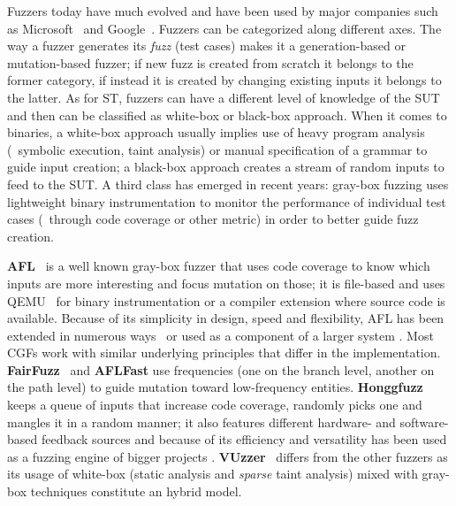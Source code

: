 Fuzzers today have much evolved and have been used by major companies such as
Microsoft~\cite{godefroid2008grammar} and
Google~\cite{google2016fuzz,google2011fuzz,google2016oss,google2017oss}. Fuzzers
can be categorized along different axes. The way a fuzzer generates its
\emph{fuzz} (test cases) makes it a generation-based or mutation-based fuzzer;
if new fuzz is created from scratch it belongs to the former category, if
instead it is created by changing existing inputs it belongs to the latter. As
for \ac{ST}, fuzzers can have a different level of knowledge of the \ac{SUT} and
then can be classified as white-box or black-box approach. When it comes to
binaries, a white-box approach usually implies use of heavy program analysis
(\eg~symbolic execution, taint analysis) or manual specification of a grammar to
guide input creation; a black-box approach creates a stream of random inputs to
feed to the \ac{SUT}. A third class has emerged in recent years: gray-box
fuzzing uses lightweight binary instrumentation to monitor the performance of
individual test cases (\eg~through code coverage or other metric) in order to
better guide fuzz creation.

\textbf{AFL}~\cite{afl} is a well known gray-box fuzzer that uses code coverage
to know which inputs are more interesting and focus mutation on those; it is
file-based and uses QEMU~\cite{bellard2005qemu} for binary instrumentation or a
compiler extension where source code is available. Because of its simplicity in
design, speed and flexibility, AFL has been extended in numerous
ways~\cite{bohme2017coverage,bohme2017directed,lemieux2017fairfuzz} or used as a
component of a larger system
\cite{stephens2016driller,nichols2017faster,li2017steelix}. Most \acp{CGF} work
with similar underlying principles that differ in the implementation.
\textbf{FairFuzz}~\cite{lemieux2017fairfuzz} and \textbf{AFLFast}
\cite{bohme2017coverage} use frequencies (one on the branch level, another on
the path level) to guide mutation toward low-frequency entities.
\textbf{Honggfuzz}~\cite{honggfuzz} keeps a queue of inputs that increase code
coverage, randomly picks one and mangles it in a random manner; it also features
different hardware- and software- based feedback sources and because of its
efficiency and versatility has been used as a fuzzing engine of bigger projects
\cite{grieco2016quickfuzz}. \textbf{VUzzer}~\cite{rawat2017vuzzer} differs from
the other fuzzers as its usage of white-box (static analysis and \emph{sparse}
taint analysis) mixed with gray-box techniques constitute an hybrid model.



